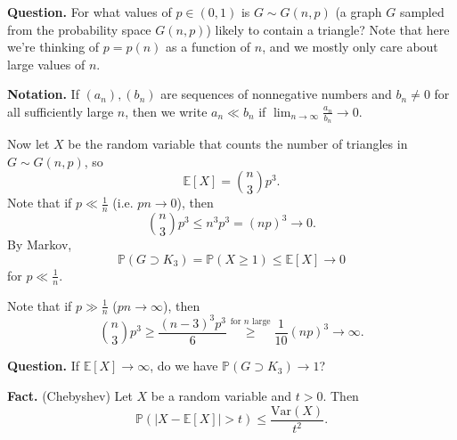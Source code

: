 \documentclass{article}
\theoremstyle{definition}
\begin{document}
\textbf{Question.} For what values of $p \in (0,1)$ is $G \sim G(n,p)$ (a graph $G$ sampled from the probability space $G(n,p)$) likely to contain a triangle? Note that here we're thinking of $p=p(n)$ as a function of $n$, and we mostly only care about large values of $n$.
\vspace{1mm}

\textbf{Notation.} If $(a_n), (b_n)$ are sequences of nonnegative numbers and $b_n \neq 0$ for all sufficiently large $n$, then we write $a_n \ll b_n$ if $\lim_{n \to \infty} \frac{a_n}{b_n} \to 0$.
\vspace{1mm}

Now let $X$ be the random variable that counts the number of triangles in $G \sim G(n,p)$, so \[
\mathbb{E}[X] = {{n}\choose{3}} p^3.
\]
Note that if $p \ll \frac{1}{n}$ (i.e. $pn \to 0$), then \[
{{n}\choose{3}}p^3 \le n^3p^3 = (np)^3 \to 0.
\]
By Markov, $$\mathbb{P}(G \supset K_3) = \mathbb{P}(X\ge 1) \le \mathbb{E}[X] \to 0$$ for $p \ll \frac{1}{n}$.

Note that if $p \gg \frac{1}{n}$ ($pn \to \infty$), then \[
{{n}\choose{3}}p^3 \ge \frac{(n-3)^3 p^3}{6} \stackrel{\text{for }n\text{ large}}{\ge}  \frac{1}{10}(np)^3 \to \infty.
\]

\textbf{Question.} If $\mathbb{E}[X] \to \infty$, do we have $\mathbb{P}(G \supset K_3) \to 1$?
\vspace{1mm}

\textbf{Fact.} (Chebyshev) Let $X$ be a random variable and $t>0$. Then \[
\mathbb{P}(|X - \mathbb{E}[X]| > t) \le \frac{\text{Var}(X)}{t^2}.
\]
\vspace{1mm}
\end{document}

